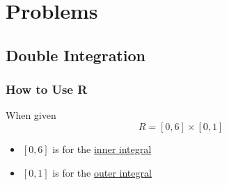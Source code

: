 \section{Problems}

  \subsection{Double Integration}

    \subsubsection{How to Use R}

      When given
      \begin{displaymath}
        R = \left[ 0, 6 \right] \times \left[ 0, 1 \right]
      \end{displaymath}

      \begin{itemize}
        \item $ \left[ 0, 6 \right] $ is for the \ul{inner integral}
        \item $ \left[ 0, 1 \right] $ is for the \ul{outer integral}
      \end{itemize}